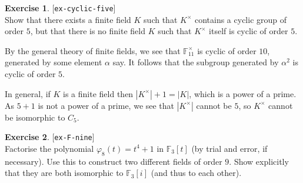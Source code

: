 \documentclass{amsart}
\newcommand{\F}         {{\mathbb{F}}}
\newcommand{\al}        {\alpha}
\newcommand{\vph}       {\varphi}
\newcommand{\tm}        {\times}
\renewcommand{\:}{\colon}
\newcommand{\lastexlabel}{}
\newcommand{\exlabel}[1]{
 \global\def\lastexlabel{#1}\label{#1}[\texttt{#1}]\ \\
}
\newcommand{\exlabel}[1]{
 \global\def\lastexlabel{#1}\label{#1}
}
\newenvironment{solution}{\SolutionInline}{\endSolutionInline}
\theoremstyle{definition}
\newtheorem{exercise}{Exercise}[section]
\renewenvironment{solution}{\SolutionAtEnd}{\endSolutionAtEnd}
\begin{document}
\begin{exercise}\exlabel{ex-cyclic-five}
 Show that there exists a finite field $K$ such that $K^\tm$ contains
 a cyclic group of order $5$, but that there is no finite field $K$
 such that $K^\tm$ itself is cyclic of order $5$.
\end{exercise}
\begin{solution}
 By the general theory of finite fields, we see that $\F_{11}^\tm$ is
 cyclic of order $10$, generated by some element $\al$ say.  It
 follows that the subgroup generated by $\al^2$ is cyclic of order
 $5$.  

 In general, if $K$ is a finite field then $|K^\tm|+1=|K|$, which is a
 power of a prime.  As $5+1$ is not a power of a prime, we see that
 $|K^\tm|$ cannot be $5$, so $K^\tm$ cannot be isomorphic to $C_5$.
\end{solution}
\begin{exercise}\exlabel{ex-F-nine}
 Factorise the polynomial $\vph_8(t)=t^4+1$ in $\F_3[t]$ (by trial and
 error, if necessary).  Use this to construct two different fields of
 order $9$.  Show explicitly that they are both isomorphic to
 $\F_3[i]$ (and thus to each other).
\end{exercise}
\end{document}
